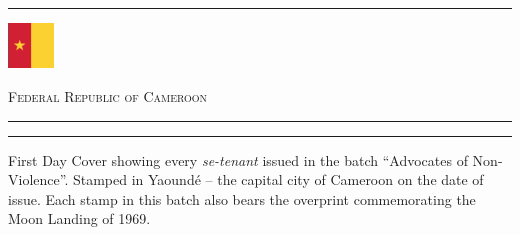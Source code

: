 \documentclass[a4paper]{article}
\begin{document}
\begin{landscape}
  \hrule
  \vspace{8pt}
  \begin{minipage}{5cm}
    \includegraphics[height=1.2cm]{images/cm}
  \end{minipage}
  \hfill
  {\scshape\huge Federal Republic of Cameroon}
  \vspace{8pt}
  \hrule
  \vspace{6cm}
  \hfill
  \begin{minipage}{4cm}
    \hrule \vspace{12pt} First Day Cover showing every {\it se-tenant}
    issued in the batch ``Advocates of Non-Violence''. Stamped in
    Yaound\'{e} -- the capital city of Cameroon on the date of issue.
    Each stamp in this batch also bears the overprint commemorating the
    Moon Landing of 1969.
  \end{minipage}
\end{landscape}
\end{document}
